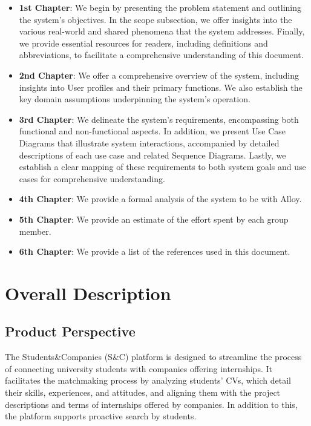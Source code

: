 \documentclass[a4paper,12pt]{article}
\begin{document}
\begin{itemize}
    \item \textbf{1st Chapter}: We begin by presenting the problem statement and outlining the system's objectives. In the scope subsection, we offer insights into the various real-world and shared phenomena that the system addresses. Finally, we provide essential resources for readers, including definitions and abbreviations, to facilitate a comprehensive understanding of this document.
    
    \item \textbf{2nd Chapter}: We offer a comprehensive overview of the system, including insights into User profiles and their primary functions. We also establish the key domain assumptions underpinning the system's operation.
    
    \item \textbf{3rd Chapter}: We delineate the system's requirements, encompassing both functional and non-functional aspects. In addition, we present Use Case Diagrams that illustrate system interactions, accompanied by detailed descriptions of each use case and related Sequence Diagrams. Lastly, we establish a clear mapping of these requirements to both system goals and use cases for comprehensive understanding.
    
    \item \textbf{4th Chapter}: We provide a formal analysis of the system to be with Alloy.
    
    \item \textbf{5th Chapter}: We provide an estimate of the effort spent by each group member.
    
    \item \textbf{6th Chapter}: We provide a list of the references used in this document.
\end{itemize}

\section{Overall Description}
\subsection{Product Perspective}
The Students\&Companies (S\&C) platform is designed to streamline the process of connecting university students with companies offering internships. It facilitates the matchmaking process by analyzing students’ CVs, which detail their skills, experiences, and attitudes, and aligning them with the project descriptions and terms of internships offered by companies. In addition to this, the platform supports proactive search by students.
\end{document}

